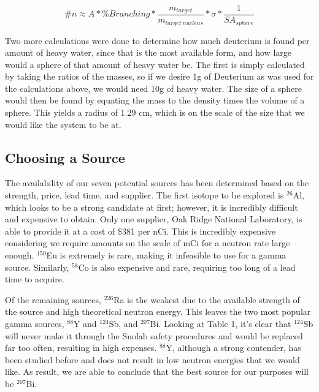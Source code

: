 \documentclass[%
12pt,
twoside,
reprint,
amsmath,amssymb,
aps,
]{article}
\begin{document}
	\begin{equation}
	\#n \approx A * \% Branching * \frac{m_{target}}{m_{target\ nucleus}} * \sigma * \frac{1}{SA_{sphere}}
	\end{equation}
	
	\par Two more calculations were done to determine how much deuterium is found per amount of heavy water, since that is the most available form, and how large would a sphere of that amount of heavy water be. The first is simply calculated by taking the ratios of the masses, so if we desire 1g of Deuterium as was used for the calculations above, we would need 10g of heavy water. The size of a sphere would then be found by equating the mass to the density times the volume of a sphere. This yields a radius of 1.29 cm, which is on the scale of the size that we would like the system to be at.
	
	\subsection{Choosing a Source}
	\par The availability of our seven potential sources has been determined based on the strength, price, lead time, and supplier. The first isotope to be explored is $^{26}$Al, which looks to be a strong candidate at first; however, it is incredibly difficult and expensive to obtain. Only one supplier, Oak Ridge National Laboratory, is able to provide it at a cost of \$381 per nCi. This is incredibly expensive considering we require amounts on the scale of mCi for a neutron rate large enough. $^{150}$Eu is extremely is rare, making it infeasible to use for a gamma source. Similarly, $^{58}$Co is also expensive and rare, requiring too long of a lead time to acquire.
	\par Of the remaining sources, $^{226}$Ra is the weakest due to the available strength of the source and high theoretical neutron energy. This leaves the two most popular gamma sources, $^{88}$Y and $^{124}$Sb, and $^{207}$Bi. Looking at Table 1, it's clear that $^{124}$Sb will never make it through the Snolab safety procedures and would be replaced far too often, resulting in high expenses. $^{88}$Y, although a strong contender, has been studied before and does not result in low neutron energies that we would like. As result, we are able to conclude that the best source for our purposes will be $^{207}$Bi.
	
\end{document}

